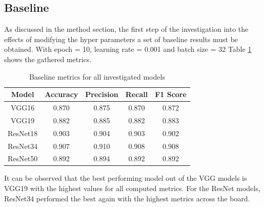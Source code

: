 \documentclass[10pt,twocolumn,letterpaper]{article}
\begin{document}
\subsection{Baseline}
As discussed in the method section, the first step of the investigation into the effects 
of modifying the hyper parameters a set of baseline results must be obtained. With epoch = 10,
learning rate = 0.001 and batch size = 32 Table  \ref{baselineresults} shows the gathered 
metrics.
\begin{table}[H]
\begin{center}
   \label{baselineresults}
   \begin{tabular}{||c c c c c||} 
    \hline
    Model & Accuracy & Precision & Recall& F1 Score \\  
    \hline\hline
    VGG16 & 0.870 & 0.875 & 0.870 & 0.872 \\ 
    \hline
    VGG19 & 0.882 & 0.885 & 0.882 & 0.883\\
    \hline
    ResNet18 & 0.903 & 0.904 & 0.903 & 0.902\\
    \hline
    ResNet34 & 0.907 & 0.910 & 0.908 & 0.908 \\
    \hline
    ResNet50 & 0.892 & 0.894 & 0.892 & 0.892 \\
    \hline
   \end{tabular}
   \caption{Baseline metrics for all investigated models}
\end{center}
\end{table}
It can be observed that the best performing model out of the VGG models is VGG19 with the 
highest values for all computed metrics. For the ResNet models, ResNet34 performed the best 
again with the highest metrics across the board.
\end{document}

